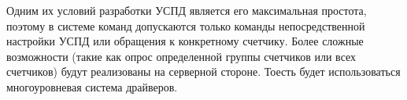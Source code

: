 Одним их условий разработки УСПД является его максимальная простота\cite{tz}, поэтому в системе команд допускаются только команды непосредственной настройки УСПД или обращения к конкретному счетчику. Более сложные возможности (такие как опрос определенной группы счетчиков или всех счетчиков) будут реализованы на серверной стороне. Тоесть будет использоваться многоуровневая система драйверов.

